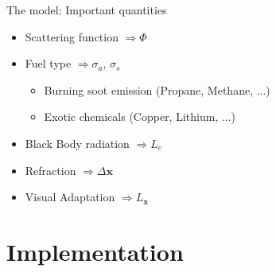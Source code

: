 \documentclass{beamer}
\newcommand{\x}{\mathbf{x}}
\begin{document}
\begin{frame}{The model: Important quantities}

\begin{itemize}
\setlength\itemsep{0.5em}
\item Scattering function $\Rightarrow \Phi$
\item Fuel type $\Rightarrow \sigma_a$, $\sigma_s$
	\begin{itemize}
	\setlength\itemsep{0.5em}
	\item Burning soot emission (Propane, Methane, ...)
	\item Exotic chemicals (Copper, Lithium, ...)
	\end{itemize}
\item Black Body radiation $\Rightarrow L_e$
\item Refraction $\Rightarrow \Delta\x$
\item Visual Adaptation $\Rightarrow L_{\x}$
\end{itemize}

\end{frame}

\section{Implementation}
\subsection{ }
\end{document}
